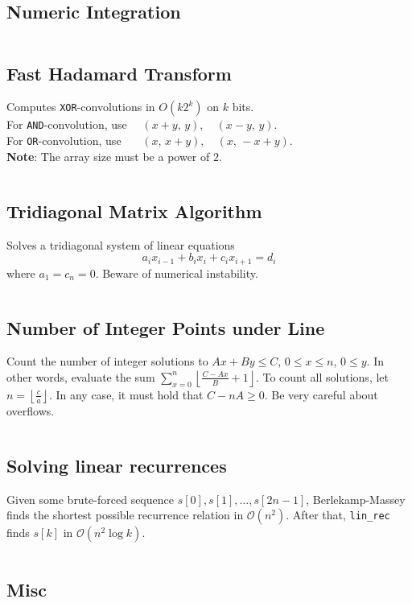 \documentclass[9pt,a4paper,landscape,oneside]{amsart}
\newcommand{\mintedstyle}[2]{\inputminted{#1}{code/#2}}
\newcommand{\code}[1]{\mintedstyle{cpp}{#1}}
\newif\ifverbose
\begin{document}
\begin{multicols*}{3}
\subsection{Numeric Integration}
\ifverbose
Numeric integration using Simpson's rule.
\fi
\code{math/numeric_integration.cpp}

\subsection{Fast Hadamard Transform}
Computes \texttt{XOR}-convolutions in $O(k 2^k)$ on $k$ bits. \\
For \texttt{AND}-convolution, use $\quad  (x + y, \, y), \quad (x-y, \, y)$. \\
For \texttt{OR}-convolution, use $\quad\,\,\, (x, \, x + y), \quad (x, \, -x + y)$. \\
\textbf{Note}: The array size must be a power of $2$.
\code{math/fht.cpp}

\subsection{Tridiagonal Matrix Algorithm}

Solves a tridiagonal system of linear equations \[ a_i x_{i-1} + b_i x_i + c_i x_{i+1} = d_i \] where $a_1 = c_n = 0$.
Beware of numerical instability.
\code{math/tridiagonal.cpp}

\subsection{Number of Integer Points under Line}
Count the number of integer solutions to $Ax+By\leq C$, $0 \leq x \leq
n$, $0 \leq y$. In other words, evaluate the sum $\sum_{x=0}^n
\left\lfloor \frac{C-Ax}{B} + 1\right\rfloor$. To count all solutions,
let $n = \left\lfloor \frac{c}{a}\right\rfloor$. In any case, it must hold
that $C-nA \geq 0$. Be very careful about overflows.
\code{math/floor_sum.cpp}

\subsection{Solving linear recurrences}
Given some brute-forced sequence $s[0], s[1], \dots, s[2n-1]$, Berlekamp-Massey finds the shortest possible recurrence relation in $\mathcal{O}(n^2)$.
After that, \texttt{lin\_rec} finds $s[k]$ in $\mathcal{O}(n^2 \log k)$.
\code{other/berlekamp-massey.cpp}

\subsection{Misc}


\end{multicols*}
\end{document}
